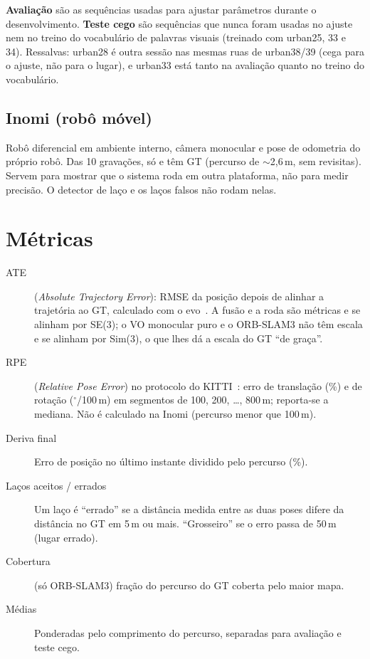 \documentclass[11pt,a4paper]{article}
\newcommand{\cmd}[1]{\texttt{\detokenize{#1}}}
\begin{document}
\textbf{Avaliação} são as sequências usadas para ajustar parâmetros durante o desenvolvimento. \textbf{Teste cego} são
sequências que nunca foram usadas no ajuste nem no treino do vocabulário de palavras visuais (treinado com urban25, 33 e
34). Ressalvas: urban28 é outra sessão nas mesmas ruas de urban38/39 (cega para o ajuste, não para o lugar), e urban33
está tanto na avaliação quanto no treino do vocabulário.

\subsection{Inomi (robô móvel)}
Robô diferencial em ambiente interno, câmera monocular e pose de odometria do próprio robô. Das 10 gravações, só
\cmd{dataset_16_16} e \cmd{dataset_16_16_n2} têm GT (percurso de $\sim$2,6\,m, sem revisitas). Servem para mostrar
que o sistema roda em outra plataforma, não para medir precisão. O detector de laço e os laços falsos não rodam nelas.

\section{Métricas}
\label{sec:metricas}

\begin{description}
  \item[ATE] (\emph{Absolute Trajectory Error}): RMSE da posição depois de alinhar a trajetória ao GT, calculado com o
    evo~\cite{grupp2017evo}. A fusão e a roda são métricas e se alinham por SE(3); o VO monocular puro e o ORB-SLAM3 não
    têm escala e se alinham por Sim(3), o que lhes dá a escala do GT ``de graça''.
  \item[RPE] (\emph{Relative Pose Error}) no protocolo do KITTI~\cite{geiger2012kitti}: erro de translação (\%) e de
    rotação ($^\circ$/100\,m) em segmentos de 100, 200, \dots, 800\,m; reporta-se a mediana. Não é calculado na Inomi
    (percurso menor que 100\,m).
  \item[Deriva final] Erro de posição no último instante dividido pelo percurso (\%).
  \item[Laços aceitos / errados] Um laço é ``errado'' se a distância medida entre as duas poses difere da distância no
    GT em 5\,m ou mais. ``Grosseiro'' se o erro passa de 50\,m (lugar errado).
  \item[Cobertura] (só ORB-SLAM3) fração do percurso do GT coberta pelo maior mapa.
  \item[Médias] Ponderadas pelo comprimento do percurso, separadas para avaliação e teste cego.
\end{description}
\end{document}

